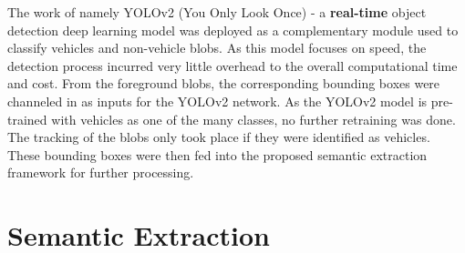 The work of  namely YOLOv2 (You Only Look Once) - a \textbf{real-time} object detection deep learning model was deployed as a complementary module used to classify vehicles and non-vehicle blobs.
As this model focuses on speed, the detection process incurred very little overhead to the overall computational time and cost.
From the foreground blobs, the corresponding bounding boxes were channeled in as inputs for the YOLOv2 network.
As the YOLOv2 model is pre-trained with vehicles as one of the many classes, no further retraining was done. The tracking of the blobs only took place if they were identified as vehicles. These bounding boxes were then fed into the proposed semantic extraction framework for further processing.


\section{Semantic Extraction}
\label{section:semanticsExtraction}

